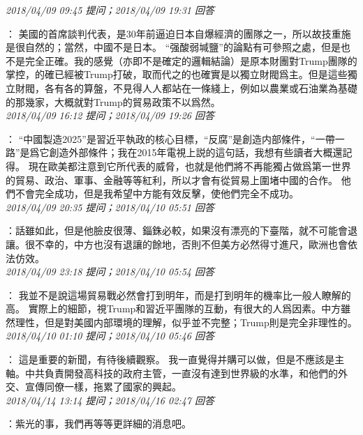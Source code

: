 \documentclass[twocolumn]{ctexart}
\begin{document}
\textit{\hfill\noindent\small 2018/04/09 09:45 提问；2018/04/09 19:31 回答}

：
美國的首席談判代表，是30年前逼迫日本自爆經濟的團隊之一，所以故技重施是很自然的；當然，中國不是日本。 
“强酸弱堿鹽”的論點有可參照之處，但是也不是完全正確。我的感覺（亦即不是確定的邏輯結論）是原本財團對Trump團隊的掌控，的確已經被Trump打破，取而代之的也確實是以獨立財閥爲主。但是這些獨立財閥，各有各的算盤，不見得人人都站在一條綫上，例如以農業或石油業為基礎的那幾家，大概就對Trump的貿易政策不以爲然。
\\

\textit{\hfill\noindent\small 2018/04/09 16:12 提问；2018/04/09 19:26 回答}

：
“中國製造2025”是習近平執政的核心目標，“反腐”是創造内部條件，“一帶一路”是爲它創造外部條件；我在2015年電視上説的這句話，我想有些讀者大概還記得。
現在歐美都注意到它所代表的威脅，也就是他們將不再能獨占做爲第一世界的貿易、政治、軍事、金融等等紅利，所以才會有從貿易上圍堵中國的合作。
他們不會完全成功，但是我希望中方能有效反擊，使他們完全不成功。
\\

\textit{\hfill\noindent\small 2018/04/09 20:35 提问；2018/04/10 05:51 回答}

：話雖如此，但是他臉皮很薄、錙銖必較，如果沒有漂亮的下臺階，就不可能會退讓。很不幸的，中方也沒有退讓的餘地，否則不但美方必然得寸進尺，歐洲也會依法仿效。
\\

\textit{\hfill\noindent\small 2018/04/09 23:18 提问；2018/04/10 05:54 回答}

：
我並不是說這場貿易戰必然會打到明年，而是打到明年的機率比一般人瞭解的高。
實際上的細節，視Trump和習近平團隊的互動，有很大的人爲因素。中方雖然理性，但是對美國内部環境的理解，似乎並不完整；Trump則是完全非理性的。
\\

\textit{\hfill\noindent\small 2018/04/10 01:10 提问；2018/04/10 05:46 回答}

：
這是重要的新聞，有待後續觀察。
我一直覺得并購可以做，但是不應該是主軸。中共負責開發高科技的政府主管，一直沒有達到世界級的水準，和他們的外交、宣傳同僚一樣，拖累了國家的興起。
\\

\textit{\hfill\noindent\small 2018/04/14 13:14 提问；2018/04/16 02:47 回答}

：紫光的事，我們再等等更詳細的消息吧。
\\
\end{document}
